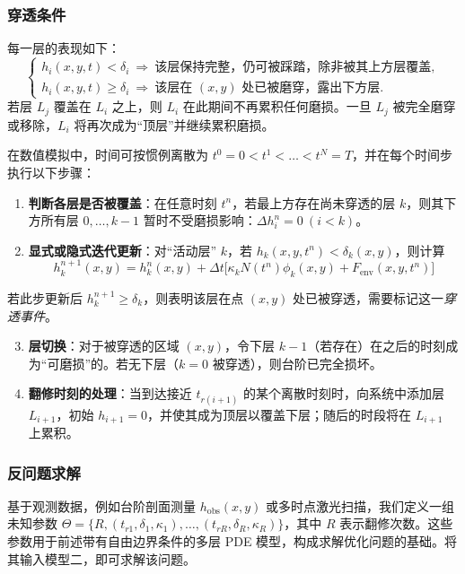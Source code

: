 \documentclass[11pt,a4paper,fontset=windows]{ctexart}
\begin{document}
\subsubsection{穿透条件}

每一层的表现如下：
\[
\begin{cases}
h_i(x,y,t)<\delta_i \ \Rightarrow\ \text{该层保持完整，仍可被踩踏，除非被其上方层覆盖},\\[2pt]
h_i(x,y,t)\ge\delta_i \ \Rightarrow\ \text{该层在 }(x,y)\text{ 处已被磨穿，露出下方层}.
\end{cases}
\]
若层 $L_j$ 覆盖在 $L_i$ 之上，则 $L_i$ 在此期间不再累积任何磨损。一旦 $L_j$ 被完全磨穿或移除，$L_i$ 将再次成为“顶层”并继续累积磨损。

在数值模拟中，时间可按惯例离散为 $t^{0}=0<t^{1}<\dots<t^{N}=T$，并在每个时间步执行以下步骤：

\begin{enumerate}
\item \textbf{判断各层是否被覆盖}：在任意时刻 $t^{n}$，若最上方存在尚未穿透的层 $k$，则其下方所有层 $0,\dots,k-1$ 暂时不受磨损影响：$\Delta h_i^{n}=0\ (i<k)$。
\item \textbf{显式或隐式迭代更新}：对“活动层” $k$，若 $h_k(x,y,t^{n})<\delta_k(x,y)$，则计算
\begin{equation}
h_k^{n+1}(x,y)=h_k^{n}(x,y)+\Delta t\bigl[\kappa_kN(t^{n})\phi_k(x,y)+F_{\text{env}}(x,y,t^{n})\bigr]
\end{equation}
\end{enumerate}

若此步更新后 $h_k^{n+1}\ge\delta_k$，则表明该层在点 $(x,y)$ 处已被穿透，需要标记这一\textit{穿透事件}。

\begin{enumerate}\setcounter{enumi}{2}
\item \textbf{层切换}：对于被穿透的区域 $(x,y)$，令下层 $k-1$（若存在）在之后的时刻成为“可磨损”的。若无下层（$k=0$ 被穿透），则台阶已完全损坏。
\item \textbf{翻修时刻的处理}：当到达接近 $t_{r(i+1)}$ 的某个离散时刻时，向系统中添加层 $L_{i+1}$，初始 $h_{i+1}=0$，并使其成为顶层以覆盖下层；随后的时段将在 $L_{i+1}$ 上累积。
\end{enumerate}

\subsubsection{反问题求解}

基于观测数据，例如台阶剖面测量 $h_{\text{obs}}(x,y)$ 或多时点激光扫描，我们定义一组未知参数 $\Theta=\{R,(t_{r1},\delta_1,\kappa_1),\dots,(t_{rR},\delta_R,\kappa_R)\}$，其中 $R$ 表示翻修次数。这些参数用于前述带有自由边界条件的多层 PDE 模型，构成求解优化问题的基础。将其输入模型二，即可求解该问题。
\end{document}
